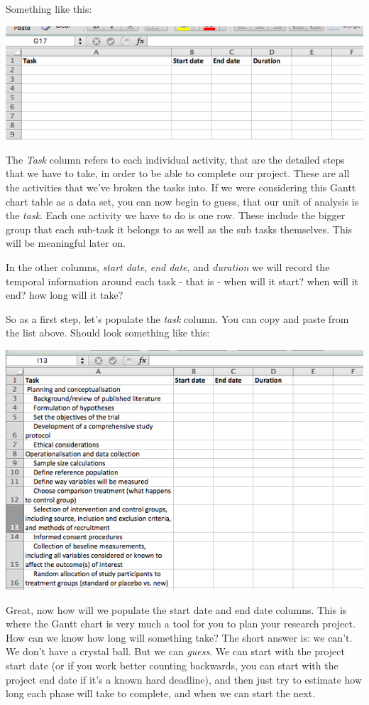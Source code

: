 \documentclass[
]{book}
\begin{document}
Something like this:

\includegraphics{imgs/gantt_headers.png}

The \emph{Task} column refers to each individual activity, that are the detailed steps that we have to take, in order to be able to complete our project. These are all the activities that we've broken the tasks into. If we were considering this Gantt chart table as a data set, you can now begin to guess, that our unit of analysis is the \emph{task}. Each one activity we have to do is one row. These include the bigger group that each sub-task it belongs to as well as the sub tasks themselves. This will be meaningful later on.

In the other columns, \emph{start date}, \emph{end date}, and \emph{duration} we will record the temporal information around each task - that is - when will it start? when will it end? how long will it take?

So as a first step, let's populate the \emph{task} column. You can copy and paste from the list above. Should look something like this:

\includegraphics{imgs/task_subtask_pop.png}

Great, now how will we populate the start date and end date columns. This is where the Gantt chart is very much a tool for you to plan your research project. How can we know how long will something take? The short answer is: we can't. We don't have a crystal ball. But we can \emph{guess}. We can start with the project start date (or if you work better counting backwards, you can start with the project end date if it's a known hard deadline), and then just try to estimate how long each phase will take to complete, and when we can start the next.
\end{document}
